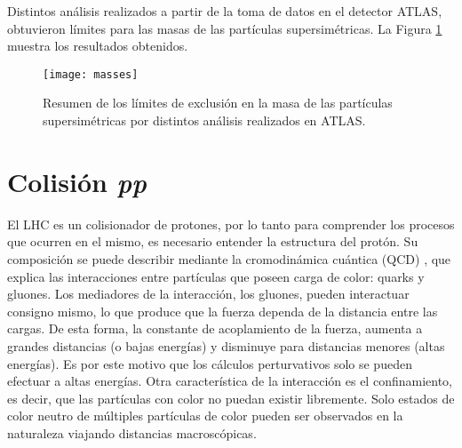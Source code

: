 Distintos análisis realizados a partir de la toma de datos en el detector ATLAS, obtuvieron límites para las masas de las partículas supersimétricas. La Figura \ref{masses} muestra los resultados obtenidos.

\begin{figure}[ht]
\centering
\texttt{[image: masses]}
\caption{Resumen de los límites de exclusión en la masa de las partículas supersimétricas por distintos análisis realizados en ATLAS. }
\label{masses}
\end{figure}



\section{Colisión \textit{pp}}

El LHC es un colisionador de protones, por lo tanto para comprender los procesos que ocurren en el mismo, es necesario entender la estructura del protón. Su composición se puede describir mediante la cromodinámica cuántica (QCD) \cite{ellis1996}, que explica las interacciones entre partículas que poseen carga de color: quarks y gluones. Los mediadores de la interacción, los gluones, pueden interactuar consigno mismo, lo que produce que la fuerza dependa de la distancia entre las cargas. De esta forma, la constante de acoplamiento de la fuerza, aumenta a grandes distancias (o bajas energías) y disminuye para distancias menores (altas energías). Es por este motivo que los cálculos perturvativos solo se pueden efectuar a altas energías. Otra característica de la interacción es el confinamiento, es decir, que las partículas con color no puedan existir libremente. Solo estados de color neutro de múltiples partículas de color pueden ser observados en la naturaleza viajando distancias macroscópicas.


